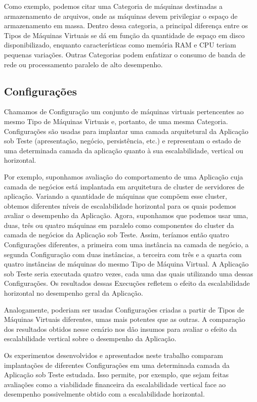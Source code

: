 Como exemplo, podemos citar uma Categoria de máquinas destinadas a armazenamento 
de arquivos, onde as máquinas devem privilegiar o espaço de armazenamento em 
massa. Dentro dessa categoria, a principal diferença entre os Tipos de Máquinas 
Virtuais se dá em função da quantidade de espaço em disco disponibilizado, 
enquanto características como memória RAM e CPU teriam pequenas variações. 
Outras Categorias podem enfatizar o consumo de banda de rede ou processamento 
paralelo de alto desempenho.

\subsection{Configurações}
Chamamos de Configuração um conjunto de máquinas virtuais pertencentes ao mesmo 
Tipo de Máquinas Virtuais e, portanto, de uma mesma Categoria. Configurações são
usadas para implantar uma camada arquitetural da Aplicação sob Teste (apresentação, 
negócio, persistência, etc.) e representam o estado de uma determinada camada da 
aplicação quanto à sua escalabilidade, vertical ou horizontal.

Por exemplo, suponhamos avaliação do comportamento de uma Aplicação cuja camada de
negócios está implantada em arquitetura de cluster de servidores de aplicação. 
Variando a quantidade de máquinas que compõem esse cluster, obtemos diferentes níveis
de escalabilidade horizontal para os quais podemos avaliar o desempenho da Aplicação.
Agora, suponhamos que podemos usar uma, duas, três ou quatro máquinas em paralelo como
componentes do cluster da camada de negócios da Aplicação sob Teste. Assim, teríamos
então quatro Configurações diferentes, a primeira com uma instância na camada de negócio,
a segunda Configuração com duas instâncias, a terceira com três e a quarta com quatro 
instâncias de máquinas do mesmo Tipo de Máquina Virtual. A Aplicação sob Teste seria 
executada quatro vezes, cada uma das quais utilizando uma dessas Configurações. Os 
resultados dessas Execuções refletem o efeito da escalabilidade horizontal no desempenho
geral da Aplicação.

Analogamente, poderiam ser usadas Configurações criadas a partir de Tipos de Máquinas
Virtuais diferentes, umas mais potentes que as outras. A comparação dos resultados obtidos
nesse cenário nos dão insumos para avaliar o efeito da escalabilidade vertical sobre o
desempenho da Aplicação.

Os experimentos desenvolvidos e apresentados neste trabalho comparam 
implantações de diferentes Configurações em uma determinada camada da Aplicação 
sob Teste estudada. Isso permite, por exemplo, que sejam feitas avaliações como 
a viabilidade financeira da escalabilidade vertical face ao desempenho 
possivelmente obtido com a escalabilidade horizontal.

